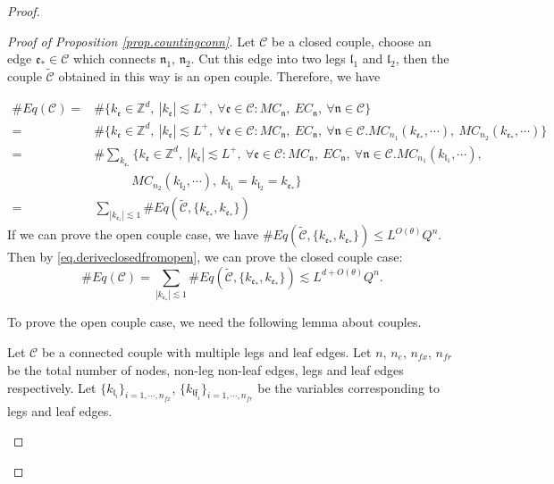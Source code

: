 \begin{proof}
\begin{proof}[Proof of Proposition \ref{prop.countingconn}]
Let $\mathcal{C}$ be a closed couple, choose an edge $\mathfrak{e}_{*}\in \mathcal{C}$ which connects $\mathfrak{n}_1$, $\mathfrak{n}_2$. Cut this edge into two legs $\mathfrak{l}_1$ and $\mathfrak{l}_2$, then the couple $\widetilde{\mathcal{C}}$ obtained in this way is an open couple. Therefore, we have

\begin{equation}\label{eq.deriveclosedfromopen}
\begin{split}
\#Eq(\mathcal{C})=&\#\{k_{\mathfrak{e}}\in \mathbb{Z}^d,\ |k_{\mathfrak{e}}| \lesssim L^+,\ \forall \mathfrak{e}\in \mathcal{C}:MC_{\mathfrak{n}},\  EC_{\mathfrak{n}},\ \forall \mathfrak{n}\in \mathcal{C}\}    
\\
=&\#\{k_{\mathfrak{e}}\in \mathbb{Z}^d,\ |k_{\mathfrak{e}}| \lesssim L^+,\ \forall \mathfrak{e}\in \mathcal{C}:MC_{\mathfrak{n}},\  EC_{\mathfrak{n}},\ \forall \mathfrak{n}\in \mathcal{C}. MC_{n_1}(k_{\mathfrak{e}_*},\cdots),\ MC_{n_2}(k_{\mathfrak{e}_*},\cdots)\}    
\\
=&\#\sum_{k_{\mathfrak{e}_*}}\{k_{\mathfrak{e}}\in \mathbb{Z}^d,\ |k_{\mathfrak{e}}| \lesssim L^+,\ \forall \mathfrak{e}\in \mathcal{C}:MC_{\mathfrak{n}},\  EC_{\mathfrak{n}},\ \forall \mathfrak{n}\in \mathcal{C}. MC_{n_1}(k_{\mathfrak{l}_1},\cdots),
\\
&\qquad\quad MC_{n_2}(k_{\mathfrak{l}_2},\cdots),\ k_{\mathfrak{l}_1}=k_{\mathfrak{l}_2}=k_{\mathfrak{e}_*}\}    
\\
=&\sum_{|k_{\mathfrak{e}_*}|\lesssim 1} \#Eq(\widetilde{\mathcal{C}},\{k_{\mathfrak{e}_*},k_{\mathfrak{e}_*}\})
\end{split}
\end{equation}
If we can prove the open couple case, we have $\#Eq(\widetilde{\mathcal{C}},\{k_{\mathfrak{e}_*},k_{\mathfrak{e}_*}\})\le L^{O(\theta)} Q^{n}$. Then by \eqref{eq.deriveclosedfromopen}, we can prove the closed couple case:  
\begin{equation}
    \#Eq(\mathcal{C})=\sum_{|k_{\mathfrak{e}_*}|\lesssim 1} \#Eq(\widetilde{\mathcal{C}},\{k_{\mathfrak{e}_*},k_{\mathfrak{e}_*}\})\lesssim L^{d+O(\theta)} Q^{n}.
\end{equation}

To prove the open couple case, we need the following lemma about couples.

\begin{lem}\label{lem.momentumconservation}
Let $\mathcal{C}$ be a connected couple with multiple legs and leaf edges. Let $n$, $n_e$, $n_{\textit{fx}}$, $n_{\textit{fr}}$ be the total number of nodes, non-leg non-leaf edges, legs and leaf edges respectively. Let $\{k_{\mathfrak{l}_i}\}_{i=1,\cdots,n_{\textit{fx}}}$, $\{k_{\mathfrak{l}\mathfrak{f}_i}\}_{i=1,\cdots,n_{\textit{fr}}}$ be the variables corresponding to legs and leaf edges. 


\end{lem}
\end{proof}
\end{proof}
